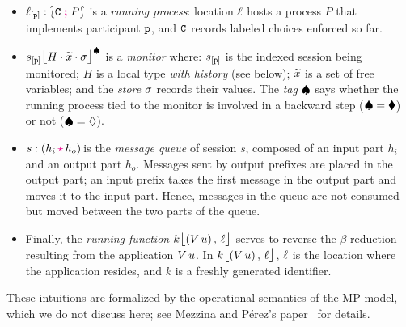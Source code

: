 \documentclass[runningheads,plain]{llncs}
\begin{document}
\begin{itemize}
\item  $\ell_{[\mathtt{p}]}:\lbag \mathtt{C} \; \textcolor{magenta}{\textbf{;}}\; P \rbag$ is a \emph{running process}:  location $\ell$ hosts a process $P$ that implements participant $\mathtt{p}$, and $\mathtt{C}$ records labeled choices enforced so far. 

\item ${s_{[\mathtt{p}]}\mbox{{\large $\lfloor$}} \textcolor{black}{H}\cdot \widetilde{x}\cdot \sigma \mbox{{\large $\rfloor$}}^{\spadesuit}}$ is a \emph{monitor}
where: 
$s_{[\mathtt{p}]}$ is the indexed session being monitored;
$H$ is a  local type \emph{with history} (see below);
$\widetilde{x}$ is a set of free variables;
and the \emph{store} $\sigma$ records their values.
The \emph{tag} $\spadesuit$ says whether 
the running process tied to the monitor is involved in a backward step ($\spadesuit = \blacklozenge$) or not ($\spadesuit = \lozenge$).

\item   $\codah{s}{h_i}{h_o}$ is the \emph{message queue} of session $s$, composed of an input part $h_i$ and an output part $h_o$.
Messages sent by output prefixes are placed in the output part; an input prefix takes the first message in the output part and moves it to the input part. Hence, messages in the queue are not consumed but moved between the two parts of the queue.

\item Finally, the \emph{running function} $k\mbox{{\large $\lfloor$}} (V\, {u})\,,\, \ell \mbox{{\large $\rfloor$}}$ serves to reverse the $\beta$-reduction resulting from the application $V\, {u}$. In $k\mbox{{\large $\lfloor$}} (V\, {u})\,,\, \ell \mbox{{\large $\rfloor$}}$, 
 $\ell$ is the location where the application resides, and 
  $k$ is a freshly generated identifier.
\end{itemize}
These intuitions are formalized by the operational semantics of the MP model, which we do not discuss here; see Mezzina and P\'{e}rez's paper~\cite{DBLP:conf/ppdp/MezzinaP17} for details.
\end{document}
